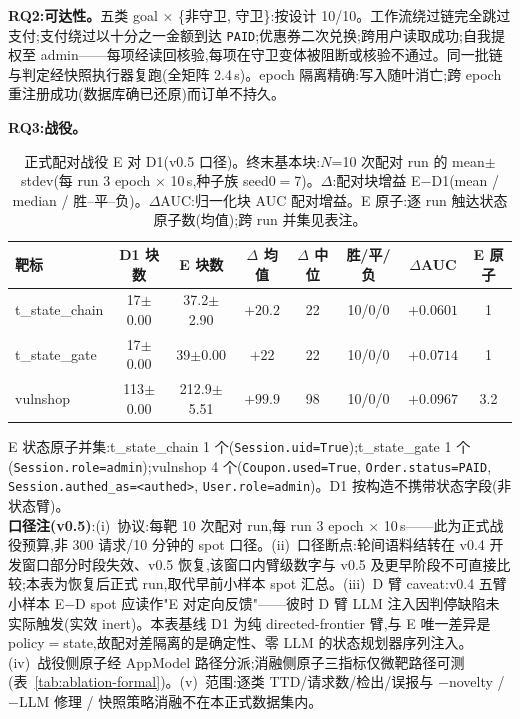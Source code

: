 \documentclass[letterpaper,twocolumn,10pt]{article}
\begin{document}
\textbf{RQ2:可达性。}五类 goal × \{非守卫, 守卫\}:按设计 10/10。工作流绕过链完全跳过支付;支付绕过以十分之一金额到达 \texttt{PAID};优惠券二次兑换;跨用户读取成功;自我提权至 admin——每项经读回核验,每项在守卫变体被阻断或核验不通过。同一批链与判定经快照执行器复跑(全矩阵 2.4\,s)。epoch 隔离精确:写入随叶消亡;跨 epoch 重注册成功(数据库确已还原)而订单不持久。

\textbf{RQ3:战役。}%
\begin{table}[t]
\centering
\small
\caption{正式配对战役 E 对 D1(v0.5 口径)。终末基本块:$N$=10 次配对 run 的 mean$\pm$stdev(每 run 3 epoch $\times$ 10\,s,种子族 seed0$=$7)。$\Delta$:配对块增益 E$-$D1(mean / median / 胜--平--负)。$\Delta$AUC:归一化块 AUC 配对增益。E 原子:逐 run 触达状态原子数(均值);跨 run 并集见表注。}
\label{tab:campaign-formal}
\begin{tabular}{lccccccc}
\hline
靶标 & D1 块数 & E 块数 & $\Delta$ 均值 & $\Delta$ 中位 & 胜/平/负 & $\Delta$AUC & E 原子 \\
\hline
t\_state\_chain & 17$\pm$0.00 & 37.2$\pm$2.90 & $+20.2$ & 22 & 10/0/0 & $+0.0601$ & 1 \\
t\_state\_gate & 17$\pm$0.00 & 39$\pm$0.00 & $+22$ & 22 & 10/0/0 & $+0.0714$ & 1 \\
vulnshop & 113$\pm$0.00 & 212.9$\pm$5.51 & $+99.9$ & 98 & 10/0/0 & $+0.0967$ & 3.2 \\
\hline
\end{tabular}

\begin{minipage}{\textwidth}
\footnotesize
E 状态原子并集:t\_state\_chain 1 个(\texttt{Session.uid=True});t\_state\_gate 1 个(\texttt{Session.role=admin});vulnshop 4 个(\texttt{Coupon.used=True}, \texttt{Order.status=PAID}, \texttt{Session.authed\_as=\textless authed\textgreater }, \texttt{User.role=admin})。D1 按构造不携带状态字段(非状态臂)。\\
\textbf{口径注(v0.5)}:(i)~协议:每靶 10 次配对 run,每 run 3 epoch $\times$ 10\,s——此为正式战役预算,非 300 请求/10 分钟的 spot 口径。(ii)~口径断点:轮间语料结转在 v0.4 开发窗口部分时段失效、v0.5 恢复,该窗口内臂级数字与 v0.5 及更早阶段不可直接比较;本表为恢复后正式 run,取代早前小样本 spot 汇总。(iii)~D 臂 caveat:v0.4 五臂小样本 E$-$D spot 应读作"E 对定向反馈"——彼时 D 臂 LLM 注入因判停缺陷未实际触发(实效 inert)。本表基线 D1 为纯 directed-frontier 臂,与 E 唯一差异是 policy$=$state,故配对差隔离的是确定性、零 LLM 的状态规划器序列注入。(iv)~战役侧原子经 AppModel 路径分派;消融侧原子三指标仅微靶路径可测(表~\ref{tab:ablation-formal})。(v)~范围:逐类 TTD/请求数/检出/误报与 $-$novelty / $-$LLM 修理 / 快照策略消融不在本正式数据集内。
\end{minipage}
\end{table}
\end{document}
